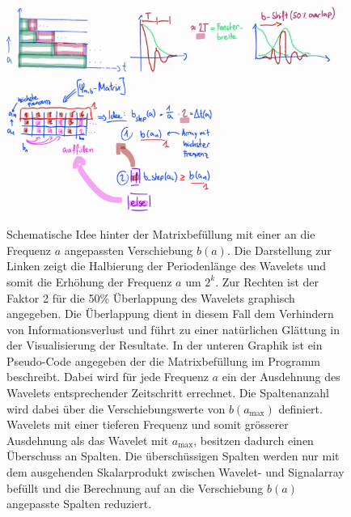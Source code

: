 \begin{figure}
	\centering
	\includegraphics[width=0.35\textwidth]{papers/wavelets/images/16-1_filterbankFillUp_1.png}
	\includegraphics[width=0.6\textwidth]{papers/wavelets/images/16-2_filterbankFillUp_2.png}
	\includegraphics[width=0.6\textwidth]{papers/wavelets/images/16-3_filterbankFillUp_3.png}
	\caption{Schematische Idee hinter der Matrixbefüllung mit
	einer an die Frequenz $a$ angepassten Verschiebung $b(a)$.
	Die Darstellung zur Linken zeigt die Halbierung der
	Periodenlänge des Wavelets und somit die Erhöhung der
	Frequenz $a$ um $2^k$.
	Zur Rechten ist der Faktor 2 für die 50\% Überlappung des
	Wavelets graphisch angegeben.
	Die Überlappung dient in diesem Fall dem Verhindern von
	Informationsverlust und führt zu einer natürlichen Glättung
	in der Visualisierung der Resultate.
	In der unteren Graphik ist ein Pseudo-Code angegeben der
	die Matrixbefüllung im Programm beschreibt.
	Dabei wird für jede Frequenz $a$ ein der Ausdehnung des
	Wavelets entsprechender Zeitschritt errechnet.
	Die Spaltenanzahl wird dabei über die Verschiebungswerte
	von $b(a_\text{max})$ definiert.
	Wavelets mit einer tieferen Frequenz und somit grösserer
	Ausdehnung als das Wavelet mit $a_\text{max}$, besitzen
	dadurch einen Überschuss an Spalten. Die überschüssigen
	Spalten werden nur mit dem ausgehenden Skalarprodukt zwischen
	Wavelet- und Signalarray befüllt und die Berechnung auf an
	die Verschiebung $b(a)$ angepasste Spalten reduziert.}
	\label{wavelet:fig:filterbankFillUp}
\end{figure}

